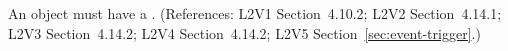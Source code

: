 An \Event object must have a .  (References: L2V1
Section~4.10.2; L2V2 Section~4.14.1; L2V3
Section~4.14.2; L2V4 Section~4.14.2; L2V5 Section~\ref{sec:event-trigger}.)
